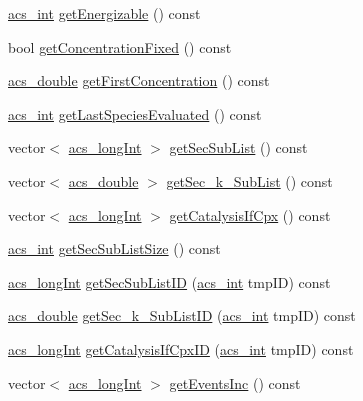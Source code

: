 \begin{DoxyCompactItemize}
\item 
\hyperlink{a00050_a8d277355641a098190360234e2ebde35}{acs\-\_\-int} \hyperlink{a00022_ad234e523f16507008b64f2d872d9792f}{get\-Energizable} () const 
\item 
bool \hyperlink{a00022_aa2b24de5a97f1e06d359ab5b63817d98}{get\-Concentration\-Fixed} () const 
\item 
\hyperlink{a00050_ab776853a005fcbf56af0424a2a4dd607}{acs\-\_\-double} \hyperlink{a00022_a6773ef96109c27ddd4afa78b87b2fcd3}{get\-First\-Concentration} () const 
\item 
\hyperlink{a00050_a8d277355641a098190360234e2ebde35}{acs\-\_\-int} \hyperlink{a00022_ace7de26d4e33dddfa78f2c624cfb3666}{get\-Last\-Species\-Evaluated} () const 
\item 
vector$<$ \hyperlink{a00050_a19319d75f02db4308bc5c0026d98cd85}{acs\-\_\-long\-Int} $>$ \hyperlink{a00022_ada53efcec76e8f241b15fd6c76d4fb79}{get\-Sec\-Sub\-List} () const 
\item 
vector$<$ \hyperlink{a00050_ab776853a005fcbf56af0424a2a4dd607}{acs\-\_\-double} $>$ \hyperlink{a00022_a30f77a52d0c75f02f6b4c269b5cf702d}{get\-Sec\-\_\-k\-\_\-\-Sub\-List} () const 
\item 
vector$<$ \hyperlink{a00050_a19319d75f02db4308bc5c0026d98cd85}{acs\-\_\-long\-Int} $>$ \hyperlink{a00022_aaafd2738231ba916153e24c19e7b3bfc}{get\-Catalysis\-If\-Cpx} () const 
\item 
\hyperlink{a00050_a8d277355641a098190360234e2ebde35}{acs\-\_\-int} \hyperlink{a00022_a984df86838272204e7a8414bbc2a61fb}{get\-Sec\-Sub\-List\-Size} () const 
\item 
\hyperlink{a00050_a19319d75f02db4308bc5c0026d98cd85}{acs\-\_\-long\-Int} \hyperlink{a00022_a214be9ae628e99e47dfd9d72c8c07933}{get\-Sec\-Sub\-List\-I\-D} (\hyperlink{a00050_a8d277355641a098190360234e2ebde35}{acs\-\_\-int} tmp\-I\-D) const 
\item 
\hyperlink{a00050_ab776853a005fcbf56af0424a2a4dd607}{acs\-\_\-double} \hyperlink{a00022_a6c546c89a974434e24f2161867521462}{get\-Sec\-\_\-k\-\_\-\-Sub\-List\-I\-D} (\hyperlink{a00050_a8d277355641a098190360234e2ebde35}{acs\-\_\-int} tmp\-I\-D) const 
\item 
\hyperlink{a00050_a19319d75f02db4308bc5c0026d98cd85}{acs\-\_\-long\-Int} \hyperlink{a00022_aac1880e5779d75ef8c700bee278da15d}{get\-Catalysis\-If\-Cpx\-I\-D} (\hyperlink{a00050_a8d277355641a098190360234e2ebde35}{acs\-\_\-int} tmp\-I\-D) const 
\item 
vector$<$ \hyperlink{a00050_a19319d75f02db4308bc5c0026d98cd85}{acs\-\_\-long\-Int} $>$ \hyperlink{a00022_aff6e7eb8affa36fac27c53c483f9e16a}{get\-Events\-Inc} () const 

\end{DoxyCompactItemize}

